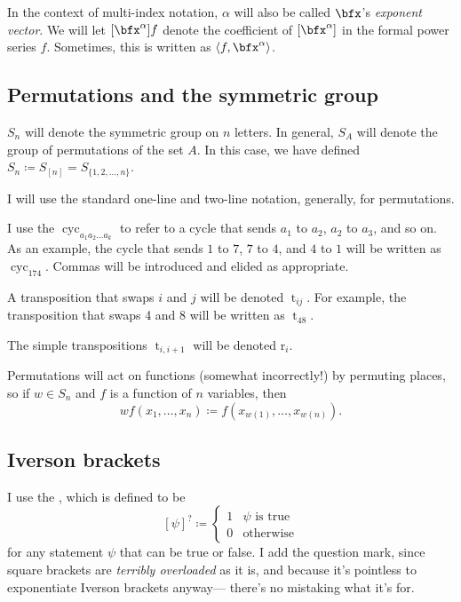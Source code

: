 \documentclass{article}
\newcommand{\InnerProduct}[1]{
    \ensuremath{
        \left\langle
            {#1}
        \right\rangle
    }
}
\DeclareMathOperator{\cyc}{cyc}
\DeclareMathOperator{\tr}{t}
\newcommand*\refl{\ensuremath{\text{r}}}
\begin{document}
In the context of multi-index notation, $\alpha$ will also be called $\bfx$'s \textit{exponent vector}.
We will let $[\bfx^\alpha]f$ denote the coefficient of $[\bfx^\alpha]$ in the formal power series $f$.
Sometimes, this is written as $\InnerProduct{f,\bfx^\alpha}$.

\subsection*{Permutations and the symmetric group}

$S_n$ will denote the symmetric group on $n$ letters.
In general, $S_A$ will denote the group of permutations of the set $A$.
In this case, we have defined $S_n \coloneq S_{[n]} = S_{\{1,2,\ldots,n\}}$.

I will use the standard one-line and two-line notation, generally, for permutations.

I use the $\cyc_{a_1a_2\ldots a_k}$ to refer to a cycle that sends $a_1$ to $a_2$, $a_2$ to $a_3$, and so on. 
As an example, the cycle that sends $1$ to $7$, $7$ to $4$, and $4$ to $1$ will be written as $\cyc_{174}$.
Commas will be introduced and elided as appropriate.

A transposition that swaps $i$ and $j$ will be denoted $\tr_{ij}$.
For example, the transposition that swaps 4 and 8 will be written as $\tr_{48}$.

The simple transpositions $\tr_{i,i+1}$ will be denoted $\refl_i$.

Permutations will act on functions (somewhat incorrectly!) by permuting places, so if $w \in S_n$ and $f$ is a function of $n$ variables, then
\[
    wf(x_1,\ldots,x_n) \coloneq f(x_{w(1)},\ldots,x_{w(n)}).
\]



\subsection*{Iverson brackets}

I use the , which is defined to be
\[
    [\psi]^? \coloneq \begin{cases}
        1 & \psi\text{ is true} \\
        0 & \text{otherwise}
    \end{cases}
\]
for any statement $\psi$ that can be true or false.
I add the question mark, since square brackets are \textit{terribly overloaded} as it is, and because it's pointless to exponentiate Iverson brackets anyway--- there's no mistaking what it's for.
\end{document}

